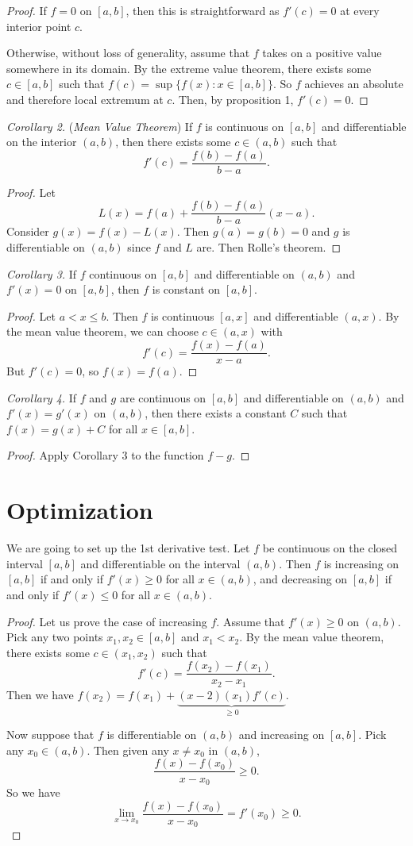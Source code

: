 \documentclass[11pt]{article}
\theoremstyle{definition}
\begin{document}
\begin{proof}
    If $f=0$ on $[a,b]$, then this is straightforward as $f'(c)=0$ at every interior point $c$.

    Otherwise, without loss of generality, assume that $f$ takes on a positive value somewhere in its domain. By the extreme value theorem, there exists some $c\in[a,b]$ such that $f(c)=\sup\{f(x):x\in[a,b]\}$. So $f$ achieves an absolute and therefore local extremum at $c$. Then, by proposition 1, $f'(c)=0$. 
\end{proof}

\textit{Corollary 2.} (\textit{Mean Value Theorem}) If $f$ is continuous on $[a,b]$ and differentiable on the interior $(a,b)$, then there exists some $c\in(a,b)$ such that 
$$ 
f'(c)=\frac{f(b)-f(a)}{b-a}.
$$
\begin{proof}
    Let 
    $$
    L(x)=f(a)+\frac{f(b)-f(a)}{b-a}(x-a).
    $$
    Consider $g(x)=f(x)-L(x)$. Then $g(a)=g(b)=0$ and $g$ is differentiable on $(a,b)$ since $f$ and $L$ are. Then Rolle's theorem.
\end{proof}

\textit{Corollary 3.} If $f$ continuous on $[a,b]$ and differentiable on $(a,b)$ and $f'(x)=0$ on $[a,b]$, then $f$ is constant on $[a,b]$.

\begin{proof}
    Let $a<x\leq b$. Then $f$ is continuous $[a,x]$ and differentiable $(a,x)$. By the mean value theorem, we can choose $c\in(a,x)$ with 
    $$
    f'(c)=\frac{f(x)-f(a)}{x-a}.
    $$
    But $f'(c)=0$, so $f(x)=f(a)$.
\end{proof}

\textit{Corollary 4.} If $f$ and $g$ are continuous on $[a,b]$ and differentiable on $(a,b)$ and $f'(x)=g'(x)$ on $(a,b)$, then there exists a constant $C$ such that $f(x)=g(x)+C$ for all $x\in[a,b]$.
\begin{proof}
    Apply Corollary 3 to the function $f-g$. 
\end{proof}

\section{Optimization}
We are going to set up the 1st derivative test.
\prop Let $f$ be continuous on the closed interval $[a,b]$ and differentiable on the interval $(a,b)$. Then $f$ is increasing on $[a,b]$ if and only if $f'(x)\geq 0$ for all $x\in(a,b)$, and decreasing on $[a,b]$ if and only if $f'(x)\leq 0$ for all $x\in (a,b)$. 
\begin{proof}
    Let us prove the case of increasing $f$. Assume that $f'(x)\geq0$ on $(a,b)$. Pick any two points $x_1,x_2\in[a,b]$ and $x_1<x_2$. By the mean value theorem, there exists some $c\in(x_1,x_2)$ such that 
    $$
    f'(c)=\frac{f(x_2)-f(x_1)}{x_2-x_1}.
    $$
    Then we have $f(x_2)=f(x_1)+\underbrace{(x-2)(x_1)f'(c)}_{\geq 0}$.

    Now suppose that $f$ is differentiable on $(a,b)$ and increasing on $[a,b]$. Pick any $x_0\in (a,b)$. Then given any $x\neq x_0$ in $(a,b)$, 
    $$
    \frac{f(x)-f(x_0)}{x-x_0}\geq 0.
    $$
    So we have
    $$
    \lim_{x\to x_0}\frac{f(x)-f(x_0)}{x-x_0}=f'(x_0)\geq 0.
    $$
\end{proof}
\end{document}
